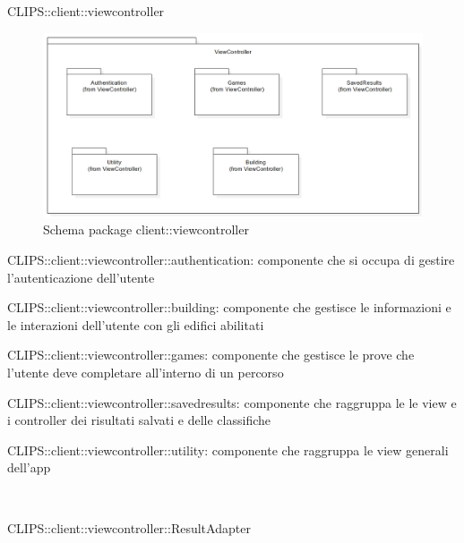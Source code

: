 \begin{componente}{CLIPS::client::viewcontroller}
\begin{figure}[h!] 
\centering 
\includegraphics[scale=0.4]{img/package/png/client--viewcontroller.png} 
\caption{Schema package client::viewcontroller} 
 \end{figure} 
\begin{compPackageContenuti}
\item CLIPS::client::viewcontroller::authentication: componente che si occupa di gestire l'autenticazione dell'utente
\item CLIPS::client::viewcontroller::building: componente che gestisce le informazioni e le interazioni dell'utente con gli edifici abilitati
\item CLIPS::client::viewcontroller::games: componente che gestisce le prove che l'utente deve completare all'interno di un percorso
\item CLIPS::client::viewcontroller::savedresults: componente che raggruppa le le view e i controller dei risultati salvati e delle classifiche
\item CLIPS::client::viewcontroller::utility: componente che raggruppa le view generali dell'app
\end{compPackageContenuti}
\begin{compClassi} \\ 
\begin{classe}{CLIPS::client::viewcontroller::ResultAdapter}
\end{classe}\end{compClassi}
\end{componente}

